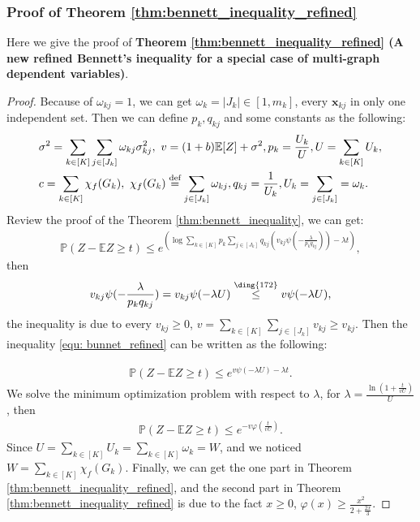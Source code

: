 \documentclass{article}
\def\vx{{\mathbf{x}}}
\def\eE{\mathbb{E}}
\def\pP{\mathbb{P}}
\def\defeq{\overset{\textup{def}}{=}}
\def\leqone{\overset{\text{\ding{172}}}{\leq}}
\begin{document}
\subsubsection{Proof of Theorem \ref{thm:bennett_inequality_refined}}
\label{pro:theorem4_proof}
Here we give the proof of \textbf{Theorem \ref{thm:bennett_inequality_refined} (A new refined Bennett's inequality for a special case of multi-graph dependent variables)}.
\begin{proof}

Because of $\omega_{kj}=1$, we can get $\omega_k = |J_k| \in [1,m_k]$, every $\vx_{kj}$  in  only one independent set. Then we can define $p_k,q_{kj}$ and some constants as the following:
        \begin{align*}
            & \sigma^2 = \sum_{k \in [K]} \sum_{j \in [J_k]} \omega_{kj} \sigma_{kj}^2, \ v = (1 + b) \eE [Z] + \sigma^2, p_k = \frac{U_k}{U}, U = \sum _{k \in [K]} U_k, \\
            & c = \sum_{k \in [K]} \chi_{f} (G_k), \ \chi_{f} (G_k) \defeq \sum_{j \in [J_k]} \omega_{kj}, q_{kj} = \frac{1}{U_k}, U_k = \sum _{j \in [J_k]} = \omega_k .
        \end{align*}
Review the proof of the Theorem \ref{thm:bennett_inequality}, we can get:
\begin{align} \label{equ: bunnet_refined}
    \pP (Z - \eE Z \geq t) \leq e^{(\log \sum _{k \in [K]} p_k \sum _{j \in [J_k]} q_{kj} (v_{kj} \psi (-\frac{\lambda}{p_k q_{kj}})) - \lambda t)},
\end{align}
then
\begin{align*}
    v_{kj} \psi (-\frac{\lambda}{p_k q_{kj}}) = v_{kj} \psi (- \lambda U) \leqone v \psi (- \lambda U),
\end{align*}
the inequality  is due to every $v_{kj} \geq 0$, $v = \sum _{k \in [K]} \sum _{j \in [J_k]} v_{kj} \geq v_{kj} $. Then the inequality \eqref{equ: bunnet_refined} can be written as the following:

\begin{align*}
    \pP (Z - \eE Z \geq t) \leq e^{v \psi(- \lambda U) - \lambda t}.
\end{align*}
We solve the minimum optimization problem with respect to $\lambda$, for $\lambda = \frac{\ln (1 + \frac{t}{v U})}{U}$, then
\begin{align*}
    \pP (Z - \eE Z \geq t) \leq e^{-v \varphi (\frac{t}{v U})}.
\end{align*}
Since $U = \sum _{k \in [K]} U_k = \sum _{k \in [K]} \omega _k = W  $, and we noticed $W = \sum _{k \in [K]} \chi_f (G_k)$. Finally, we can get the one part in Theorem \ref{thm:bennett_inequality_refined}, and the second part in Theorem \ref{thm:bennett_inequality_refined} is due to the fact $x \geq 0$, $\varphi (x) \geq \frac{x^2}{2 + \frac{2x}{3}}$.
\end{proof}
\end{document}

